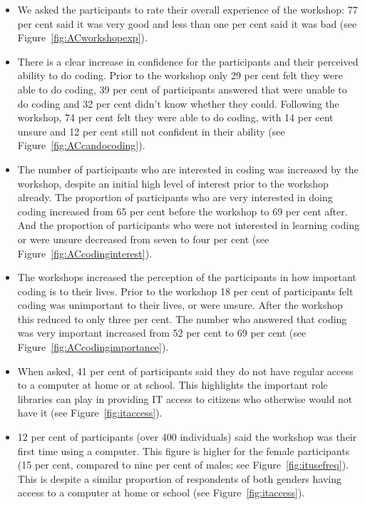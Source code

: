 \documentclass[12pt]{report} %
\begin{document}
\begin{itemize}
\item We asked the participants to rate their overall experience of the workshop: 77 per cent said it was very good and less than one per cent said it was bad (see Figure~\ref{fig:ACworkshopexp}).

\item There is a clear increase in confidence for the participants and their perceived ability to do coding. Prior to the workshop only 29 per cent felt they were able to do coding, 39 per cent of participants answered that were unable to do coding and 32 per cent didn't know whether they could. Following the workshop, 74 per cent felt they were able to do coding, with 14 per cent unsure and 12 per cent still not confident in their ability (see Figure~\ref{fig:ACcandocoding}). 

\item The number of participants who are interested in coding was increased by the workshop, despite an initial high level of interest prior to the workshop already. The proportion of participants who are very interested in doing coding increased from 65 per cent before the workshop to 69 per cent after. And the proportion of participants who were not interested in learning coding or were unsure decreased from seven to four per cent (see Figure~\ref{fig:ACcodinginterest}). 

\item The workshops increased the perception of the participants in how important coding is to their lives. Prior to the workshop 18 per cent of participants felt coding was unimportant to their lives, or were unsure. After the workshop this reduced to only three per cent. The number who answered that coding was very important increased from 52 per cent to 69 per cent (see Figure~\ref{fig:ACcodingimportance}). 

\item When asked, 41 per cent of participants said they do not have regular access to a computer at home or at school. This highlights the important role libraries can play in providing IT access to citizens who otherwise would not have it (see Figure~\ref{fig:itaccess}).

 \item 12 per cent of participants (over 400 individuals) said the workshop was their first time using a computer. This figure is higher for the female participants (15 per cent, compared to nine per cent of males; see Figure~\ref{fig:itusefreq}). This is despite a similar proportion of respondents of both genders having access to a computer at home or school (see Figure~\ref{fig:itaccess}).
 

\end{itemize}
\end{document}
